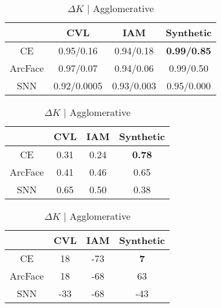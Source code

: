 \begin{table}[ht]
{        \hfill
        \begin{subtable}{0.4\linewidth}
            \centering
            \caption{RI / ARI | K-Means}
            \begin{tabular}{|c|c|c|c|}
            \hline
                & CVL & IAM & Synthetic \\
            \hline
            CE & 0.95/0.16 & 0.94/0.18 & \textbf{0.99/0.85} \\
            ArcFace & 0.97/0.07 & 0.94/0.06 & 0.99/0.50 \\
            SNN & 0.92/0.0005 & 0.93/0.003 & 0.95/0.000 \\
            \hline
            \end{tabular}
        \end{subtable}
    }
    \baselineskip
    \hspace*{-4em}\scalebox{0.75} {
        \begin{subtable}{0.4\linewidth}
            \centering
            \caption{Silhouette Score | Agglomerative}
            \begin{tabular}{|c|c|c|c|}
            \hline
                & CVL & IAM & Synthetic \\
            \hline
            CE & 0.31 & 0.24 & \textbf{0.78} \\
            ArcFace & 0.41 & 0.46 & 0.65 \\
            SNN & 0.65 & 0.50 & 0.38 \\
            \hline
            \end{tabular}
        \end{subtable}
    
        \hfill
        \begin{subtable}{0.4\linewidth}
            \centering
            \caption{$\Delta K$ | Agglomerative}
            \begin{tabular}{|c|c|c|c|}
            \hline
                & CVL & IAM & Synthetic \\
            \hline
            CE & 18 & -73 & \textbf{7} \\
            ArcFace & 18 & -68 & 63 \\
            SNN & -33 & -68 & -43 \\
            \hline
            \end{tabular}
        \end{subtable}
        
}
\end{table}

